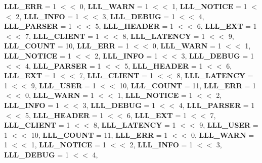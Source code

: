 \begin{DoxyCompactItemize}
{\bfseries L\+L\+L\+\_\+\+E\+RR} = 1 $<$$<$ 0, 
{\bfseries L\+L\+L\+\_\+\+W\+A\+RN} = 1 $<$$<$ 1, 
{\bfseries L\+L\+L\+\_\+\+N\+O\+T\+I\+CE} = 1 $<$$<$ 2, 
{\bfseries L\+L\+L\+\_\+\+I\+N\+FO} = 1 $<$$<$ 3, 
\newline
{\bfseries L\+L\+L\+\_\+\+D\+E\+B\+UG} = 1 $<$$<$ 4, 
{\bfseries L\+L\+L\+\_\+\+P\+A\+R\+S\+ER} = 1 $<$$<$ 5, 
{\bfseries L\+L\+L\+\_\+\+H\+E\+A\+D\+ER} = 1 $<$$<$ 6, 
{\bfseries L\+L\+L\+\_\+\+E\+XT} = 1 $<$$<$ 7, 
\newline
{\bfseries L\+L\+L\+\_\+\+C\+L\+I\+E\+NT} = 1 $<$$<$ 8, 
{\bfseries L\+L\+L\+\_\+\+L\+A\+T\+E\+N\+CY} = 1 $<$$<$ 9, 
{\bfseries L\+L\+L\+\_\+\+C\+O\+U\+NT} = 10, 
{\bfseries L\+L\+L\+\_\+\+E\+RR} = 1 $<$$<$ 0, 
\newline
{\bfseries L\+L\+L\+\_\+\+W\+A\+RN} = 1 $<$$<$ 1, 
{\bfseries L\+L\+L\+\_\+\+N\+O\+T\+I\+CE} = 1 $<$$<$ 2, 
{\bfseries L\+L\+L\+\_\+\+I\+N\+FO} = 1 $<$$<$ 3, 
{\bfseries L\+L\+L\+\_\+\+D\+E\+B\+UG} = 1 $<$$<$ 4, 
\newline
{\bfseries L\+L\+L\+\_\+\+P\+A\+R\+S\+ER} = 1 $<$$<$ 5, 
{\bfseries L\+L\+L\+\_\+\+H\+E\+A\+D\+ER} = 1 $<$$<$ 6, 
{\bfseries L\+L\+L\+\_\+\+E\+XT} = 1 $<$$<$ 7, 
{\bfseries L\+L\+L\+\_\+\+C\+L\+I\+E\+NT} = 1 $<$$<$ 8, 
\newline
{\bfseries L\+L\+L\+\_\+\+L\+A\+T\+E\+N\+CY} = 1 $<$$<$ 9, 
{\bfseries L\+L\+L\+\_\+\+U\+S\+ER} = 1 $<$$<$ 10, 
{\bfseries L\+L\+L\+\_\+\+C\+O\+U\+NT} = 11, 
{\bfseries L\+L\+L\+\_\+\+E\+RR} = 1 $<$$<$ 0, 
\newline
{\bfseries L\+L\+L\+\_\+\+W\+A\+RN} = 1 $<$$<$ 1, 
{\bfseries L\+L\+L\+\_\+\+N\+O\+T\+I\+CE} = 1 $<$$<$ 2, 
{\bfseries L\+L\+L\+\_\+\+I\+N\+FO} = 1 $<$$<$ 3, 
{\bfseries L\+L\+L\+\_\+\+D\+E\+B\+UG} = 1 $<$$<$ 4, 
\newline
{\bfseries L\+L\+L\+\_\+\+P\+A\+R\+S\+ER} = 1 $<$$<$ 5, 
{\bfseries L\+L\+L\+\_\+\+H\+E\+A\+D\+ER} = 1 $<$$<$ 6, 
{\bfseries L\+L\+L\+\_\+\+E\+XT} = 1 $<$$<$ 7, 
{\bfseries L\+L\+L\+\_\+\+C\+L\+I\+E\+NT} = 1 $<$$<$ 8, 
\newline
{\bfseries L\+L\+L\+\_\+\+L\+A\+T\+E\+N\+CY} = 1 $<$$<$ 9, 
{\bfseries L\+L\+L\+\_\+\+U\+S\+ER} = 1 $<$$<$ 10, 
{\bfseries L\+L\+L\+\_\+\+C\+O\+U\+NT} = 11, 
{\bfseries L\+L\+L\+\_\+\+E\+RR} = 1 $<$$<$ 0, 
\newline
{\bfseries L\+L\+L\+\_\+\+W\+A\+RN} = 1 $<$$<$ 1, 
{\bfseries L\+L\+L\+\_\+\+N\+O\+T\+I\+CE} = 1 $<$$<$ 2, 
{\bfseries L\+L\+L\+\_\+\+I\+N\+FO} = 1 $<$$<$ 3, 
{\bfseries L\+L\+L\+\_\+\+D\+E\+B\+UG} = 1 $<$$<$ 4, 
\newline
$$
\end{DoxyCompactItemize}
